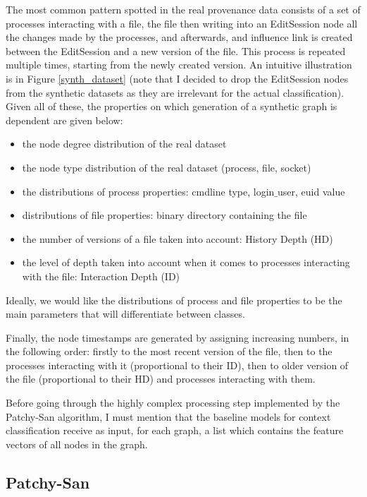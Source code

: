 The most common pattern spotted in the real provenance data consists of a set of processes interacting with a file, the file then writing into an EditSession node all the changes made by the processes, and afterwards, and influence link is created between the EditSession and a new version of the file. This process is repeated multiple times, starting from the newly created version. An intuitive illustration is in Figure \ref{synth_dataset} (note that I decided to drop the EditSession nodes from the synthetic datasets as they are irrelevant for the actual classification). Given all of these, the properties on which generation of a synthetic graph is dependent are given below:

\begin{itemize}
    \item the node degree distribution of the real dataset
    \item the node type distribution of the real dataset (process, file, socket)
    \item the distributions of process properties: cmdline type, login$\_$user, euid value
    \item distributions of file properties: binary directory containing the file
    \item the number of versions of a file taken into account: History Depth (HD)
    \item the level of depth taken into account when it comes to processes interacting with the file: Interaction Depth (ID)
\end{itemize}

Ideally, we would like the distributions of process and file properties to be the main parameters that will differentiate between classes. \smallskip

Finally, the node timestamps are generated by assigning increasing numbers, in the following order: firstly to the most recent version of the file, then to the processes interacting with it (proportional to their ID), then to older version of the file (proportional to their HD) and processes interacting with them. \smallskip

Before going through the highly complex processing step implemented by the Patchy-San algorithm, I must mention that the baseline models for context classification receive as input, for each graph, a list which contains the feature vectors of all nodes in the graph. \smallskip

\subsection{Patchy-San} \label{PCSN}

